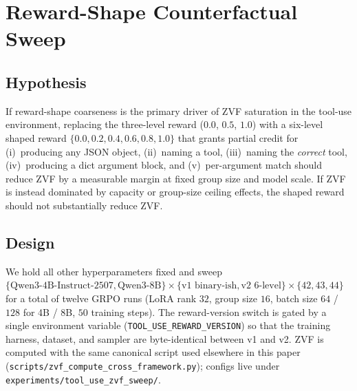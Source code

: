 
\section{Reward-Shape Counterfactual Sweep}
\label{app:zvf_counterfactual}

\subsection{Hypothesis}
If reward-shape coarseness is the primary driver of ZVF saturation in the
tool-use environment, replacing the three-level reward (\(0.0\), \(0.5\), \(1.0\))
with a six-level shaped reward
\(\{0.0, 0.2, 0.4, 0.6, 0.8, 1.0\}\)
that grants partial credit for (i)~producing any JSON object, (ii)~naming a
tool, (iii)~naming the \emph{correct} tool, (iv)~producing a dict argument
block, and (v)~per-argument match should reduce ZVF by a measurable margin at
fixed group size and model scale. If ZVF is instead dominated by capacity or
group-size ceiling effects, the shaped reward should not substantially reduce
ZVF.

\subsection{Design}
We hold all other hyperparameters fixed and sweep
\(\{\text{Qwen3-4B-Instruct-2507}, \text{Qwen3-8B}\}
 \times \{\text{v1 binary-ish}, \text{v2 6-level}\}
 \times \{42, 43, 44\}\)
for a total of twelve GRPO runs
(LoRA rank \(32\), group size \(16\), batch size
\(64\) / \(128\) for 4B / 8B, \(50\) training steps).
The reward-version switch is gated by a single environment variable
(\texttt{TOOL\_USE\_REWARD\_VERSION}) so that the training harness, dataset,
and sampler are byte-identical between v1 and v2. ZVF is computed with the
same canonical script used elsewhere in this paper
(\texttt{scripts/zvf\_compute\_cross\_framework.py}); configs live under
\texttt{experiments/tool\_use\_zvf\_sweep/}.

